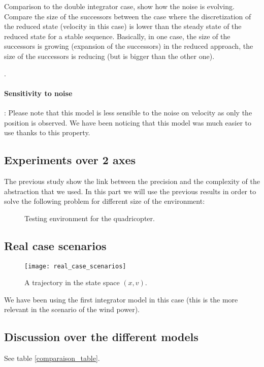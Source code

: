 Comparison to the double integrator case, show how the noise is evolving. Compare the size of the successors between the case where the discretization of the reduced state (velocity in this case) is lower than the steady state of the reduced state for a stable sequence. Basically, in one case, the size of the successors is growing (expansion of the successors) in the reduced approach, the size of the successors is reducing (but is bigger than the other one).


.

\paragraph{Sensitivity to noise}:
Please note that this model is less sensible to the noise on velocity as only the position is observed.
We have been noticing that this model was much easier to use thanks to this property.

\subsection{Experiments over 2 axes}
The previous study show the link between the precision and the complexity of the abstraction that we used.
In this part we will use the previous results in order to solve the following problem for different size of the environment:
\begin{figure}
	\center
	
	\caption{Testing environment for the quadricopter.}
	\label{fig:environment}
\end{figure}



\subsection{Real case scenarios}

\begin{figure}[!ht]
  \centering
  \texttt{[image: real\_case\_scenarios]}
  \caption{A trajectory in the state space $(x,v)$.}
\end{figure}

We have been using the first integrator model in this case (this is the more relevant in the scenario of the wind power).

\subsection{Discussion over the different models}
See table \ref{comparaison_table}.

